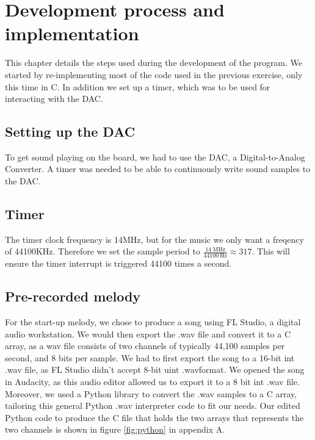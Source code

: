 \section{Development process and implementation}
\label{chap:development_process}

This chapter details the steps used during the development of the program.
We started by re-implementing most of the code used in the previous exercise, only this time in C.
In addition we set up a timer, which was to be used for interacting with the DAC.


\subsection{Setting up the DAC}

To get sound playing on the board, we had to use the DAC, a Digital-to-Analog Converter.
A timer was needed to be able to continuously write sound samples to the DAC.

\subsection{Timer}

The timer clock frequency is 14MHz, but for the music we only want a freqency of 44100KHz.
Therefore we set the sample period to $ \frac{\SI{14}{\mega\hertz}}{\SI{44100}{\hertz}} \approx 317 $.
This will ensure the timer interrupt is triggered 44100 times a second.



\subsection{Pre-recorded melody}

For the start-up melody, we chose to produce a song using FL Studio, a digital audio workstation.
We would then export the .wav file and convert it to a C array, as a wav file consists of two channels of typically 44,100 samples per second, and 8 bits per sample.
We had to first export the song to a 16-bit int .wav file, as FL Studio didn't accept 8-bit uint .wavformat.
We opened the song in Audacity, as this audio editor allowed us to export it to a 8 bit int .wav file.
Moreover, we used a Python library to convert the .wav samples to a C array, tailoring this general Python .wav interpreter code \cite{wav} to fit our needs. Our edited Python code to produce the C file that holds the two arrays that represents the two channels is shown in figure \ref{fig:python} in appendix A.

